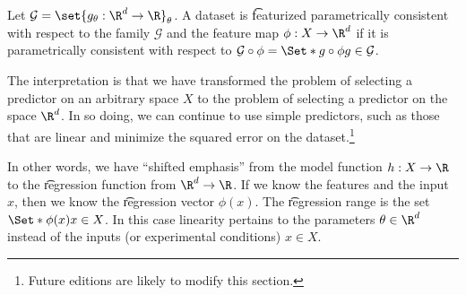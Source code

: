 Let $\mathcal{G}  = \set{g_{\theta }: \R ^d \to \R }_{\theta }$.
A dataset is \t{featurized parametrically consistent} with respect to the family $\mathcal{G} $ and the feature map $\phi : X \to \R ^d$ if it is parametrically consistent with respect to $\mathcal{G}  \circ \phi  = \Set*{g \circ \phi }{g \in \mathcal{G} }$.

The interpretation is that we have transformed the problem of selecting a predictor on an arbitrary space $X$ to the problem of selecting a predictor on the space $\R ^d$.
In so doing, we can continue to use simple predictors, such as those that are linear and minimize the squared error on the dataset.\footnote{Future editions are likely to modify this section.}

In other words, we have ``shifted emphasis'' from the model function $h: X \to \R $ to the \t{regression function} from $\R ^d \to \R $.
If we know the features and the input $x$, then we know the \t{regression vector} $\phi (x)$.
The \t{regression range} is the set $\Set*{\phi (x)}{x \in X}$.
In this case linearity pertains to the parameters $\theta  \in \R ^d$ instead of the inputs (or experimental conditions) $x \in X$.
